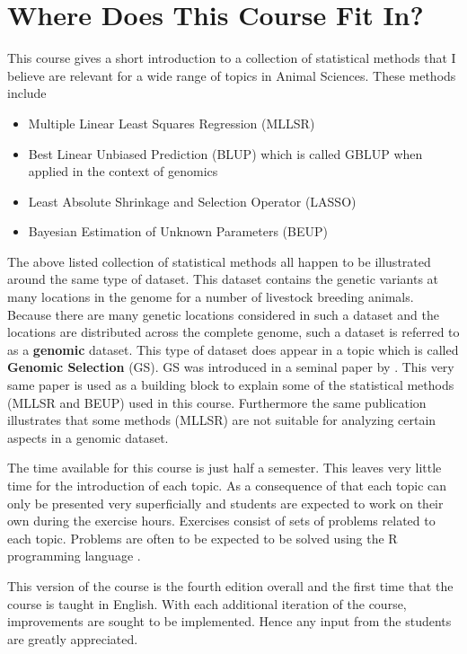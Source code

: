 \documentclass[]{book}
\providecommand{\tightlist}{%
  \setlength{\itemsep}{0pt}\setlength{\parskip}{0pt}}
\theoremstyle{definition}
\theoremstyle{definition}
\theoremstyle{definition}
\theoremstyle{remark}
\begin{document}
\hypertarget{where-does-this-course-fit-in}{%
\section*{Where Does This Course Fit In?}\label{where-does-this-course-fit-in}}

This course gives a short introduction to a collection of statistical methods that I believe are relevant for a wide range of topics in Animal Sciences. These methods include

\begin{itemize}
\tightlist
\item
  Multiple Linear Least Squares Regression (MLLSR)
\item
  Best Linear Unbiased Prediction (BLUP) which is called GBLUP when applied in the context of genomics
\item
  Least Absolute Shrinkage and Selection Operator (LASSO)
\item
  Bayesian Estimation of Unknown Parameters (BEUP)
\end{itemize}

The above listed collection of statistical methods all happen to be illustrated around the same type of dataset. This dataset contains the genetic variants at many locations in the genome for a number of livestock breeding animals. Because there are many genetic locations considered in such a dataset and the locations are distributed across the complete genome, such a dataset is referred to as a \textbf{genomic} dataset. This type of dataset does appear in a topic which is called \textbf{Genomic Selection} (GS). GS was introduced in a seminal paper by \citep{Meuwissen2001}. This very same paper is used as a building block to explain some of the statistical methods (MLLSR and BEUP) used in this course. Furthermore the same publication illustrates that some methods (MLLSR) are not suitable for analyzing certain aspects in a genomic dataset.

The time available for this course is just half a semester. This leaves very little time for the introduction of each topic. As a consequence of that each topic can only be presented very superficially and students are expected to work on their own during the exercise hours. Exercises consist of sets of problems related to each topic. Problems are often to be expected to be solved using the R programming language \citep{RCoreTeam2018}.

This version of the course is the fourth edition overall and the first time that the course is taught in English. With each additional iteration of the course, improvements are sought to be implemented. Hence any input from the students are greatly appreciated.
\end{document}
